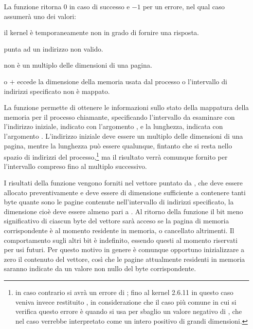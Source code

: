\begin{funcproto}{
}
{La funzione ritorna $0$ in caso di successo e $-1$ per un errore, nel qual
caso  assumerà uno dei valori:
\begin{errlist}
   \item[\errcode{EAGAIN}] il kernel è temporaneamente non in grado di fornire
     una risposta.
   \item[\errcode{EFAULT}]  punta ad un indirizzo non valido.
   \item[\errcode{EINVAL}]  non è un multiplo delle dimensioni di
     una pagina.
   \item[\errcode{ENOMEM}] o $+$ eccede la dimensione
     della memoria usata dal processo o l'intervallo di indirizzi specificato
     non è mappato.
\end{errlist}}
\end{funcproto}

La funzione permette di ottenere le informazioni sullo stato della mappatura
della memoria per il processo chiamante, specificando l'intervallo da
esaminare con l'indirizzo iniziale, indicato con l'argomento , e
la lunghezza, indicata con l'argomento . L'indirizzo iniziale
deve essere un multiplo delle dimensioni di una pagina, mentre la lunghezza
può essere qualunque, fintanto che si resta nello spazio di indirizzi del
processo,\footnote{in caso contrario si avrà un errore di ;
  fino al kernel 2.6.11 in questo caso veniva invece restituito
  , in considerazione che il caso più comune in cui si
  verifica questo errore è quando si usa per sbaglio un valore negativo
  di , che nel caso verrebbe interpretato come un intero
  positivo di grandi dimensioni.}  ma il risultato verrà comunque fornito per
l'intervallo compreso fino al multiplo successivo.

I risultati della funzione vengono forniti nel vettore puntato da ,
che deve essere allocato preventivamente e deve essere di dimensione
sufficiente a contenere tanti byte quante sono le pagine contenute
nell'intervallo di indirizzi specificato, la dimensione cioè deve essere
almeno pari a .  Al ritorno della
funzione il bit meno significativo di ciascun byte del vettore sarà acceso se
la pagina di memoria corrispondente è al momento residente in memoria, o
cancellato altrimenti. Il comportamento sugli altri bit è indefinito, essendo
questi al momento riservati per usi futuri. Per questo motivo in genere è
comunque opportuno inizializzare a zero il contenuto del vettore, così che le
pagine attualmente residenti in memoria saranno indicate da un valore non
nullo del byte corrispondente.

